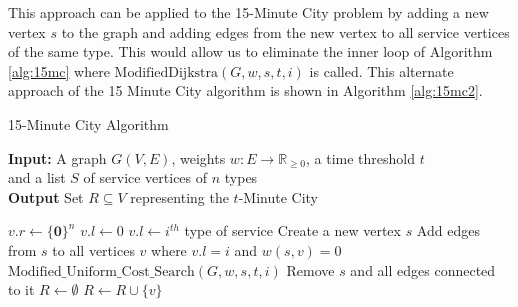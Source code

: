 This approach can be applied to the 15-Minute City problem by adding a new vertex $s$ to the graph and adding edges from the new vertex to all service vertices of the same type. This would allow us to eliminate the inner loop of Algorithm \ref{alg:15mc} where $\text{ModifiedDijkstra}(G, w, s, t, i)$ is called. This alternate approach of the 15 Minute City algorithm is shown in Algorithm \ref{alg:15mc2}.

\begin{algorithm}[H]
    \caption{15-Minute City Algorithm} \label{alg:15mc2}
    \textbf{Input:} A graph $G(V,E)$, weights $w:E\rightarrow\mathbb{R}_{\geq 0}$, a time threshold $t$ \\  and a list $S$ of service vertices of $n$ types\\
    \textbf{Output} Set $R\subseteq V$ representing the $t$-Minute City
    \begin{algorithmic}
            \State $v.r \gets \{\mathbf{0}\}^{n}$
            \State $v.l \gets 0$
        \EndFor
            \State $v.l \gets i^{th}$ type of service
        \EndFor
            \State Create a new vertex $s$
            \State Add edges from $s$ to all vertices $v$ where $v.l=i$ and $w(s,v)=0$
            \State $\text{Modified_Uniform_Cost_Search}(G,w,s,t,i)$
            \State Remove $s$ and all edges connected  to it
        \EndFor
        \State $R\gets\emptyset$
                \State $R \gets R\cup \{v\}$
            \EndIf
        \EndFor
    \end{algorithmic}
\end{algorithm}